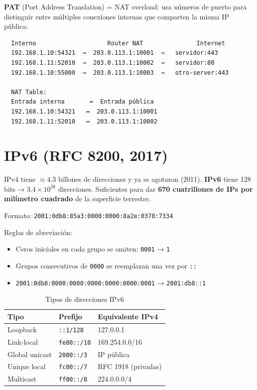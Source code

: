 \textbf{PAT} (Port Address Translation) = NAT overload: usa números de puerto
para distinguir entre múltiples conexiones internas que comparten la misma IP pública:

\begin{lstlisting}
  Interno                    Router NAT               Internet
  192.168.1.10:54321  →  203.0.113.1:10001  →   servidor:443
  192.168.1.11:52010  →  203.0.113.1:10002  →   servidor:80
  192.168.1.10:55000  →  203.0.113.1:10003  →   otro-server:443

  NAT Table:
  Entrada interna       ↔  Entrada pública
  192.168.1.10:54321   ↔  203.0.113.1:10001
  192.168.1.11:52010   ↔  203.0.113.1:10002
\end{lstlisting}

\section{ IPv6 (RFC 8200, 2017)}

\begin{concepto}
IPv4 tiene $\approx 4.3$ billones de direcciones y ya se agotaron (2011).
\textbf{IPv6} tiene 128 bits → $3.4 \times 10^{38}$ direcciones.
Suficientes para dar \textbf{670 cuatrillones de IPs por milímetro cuadrado}
de la superficie terrestre.
\end{concepto}

Formato: \texttt{2001:0db8:85a3:0000:0000:8a2e:0370:7334}

Reglas de abreviación:
\begin{itemize}
    \item Ceros iniciales en cada grupo se omiten: \texttt{0001} → \texttt{1}
    \item Grupos consecutivos de \texttt{0000} se reemplazan una vez por \texttt{::}
    \item \texttt{2001:0db8:0000:0000:0000:0000:0000:0001} → \texttt{2001:db8::1}
\end{itemize}

\begin{table}[h!]
\centering
\renewcommand{\arraystretch}{1.3}
\begin{tabular}{lll}
\toprule
\textbf{Tipo} & \textbf{Prefijo} & \textbf{Equivalente IPv4} \\
\midrule
Loopback        & \texttt{::1/128}     & 127.0.0.1 \\
Link-local      & \texttt{fe80::/10}   & 169.254.0.0/16 \\
Global unicast  & \texttt{2000::/3}    & IP pública \\
Unique local    & \texttt{fc00::/7}    & RFC 1918 (privadas) \\
Multicast       & \texttt{ff00::/8}    & 224.0.0.0/4 \\
\bottomrule
\end{tabular}
\caption{Tipos de direcciones IPv6}
\end{table}

